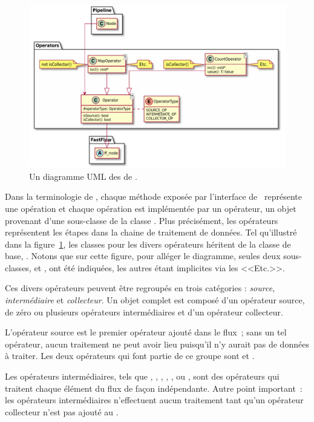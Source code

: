 \begin{figure}
\centering
         \includegraphics[width=1.0\textwidth]{Figures/operators-details.pdf}
      \caption{Un diagramme UML des  de \ppff.}
       \label{operators.fig}
\end{figure}


Dans la terminologie de , chaque m\'ethode expos\'ee par l'interface de \ppff\ repr\'esente une op\'eration et chaque op\'eration est impl\'ement\'ee par un op\'erateur, un objet provenant d'une sous-classe de la classe . Plus pr\'ecisément, les op\'erateurs repr\'esentent les \'etapes dans la chaine de traitement de donn\'ees. Tel qu'illustré dans la figure~\ref{operators.fig}, les classes pour les divers op\'erateurs h\'eritent de la classe de base, . 
%
Notons que sur cette figure, pour alléger le diagramme, seules deux sous-classes,  et , ont été indiqu\'ees, les autres \'etant implicites via les <<Etc.>>.
%

Ces divers opérateurs peuvent \^etre regroupés en trois cat\'egories : \emph{source}, \emph{interm\'ediaire} et \emph{collecteur}.
%
Un objet  complet est compos\'e d'un op\'erateur source, de z\'ero ou plusieurs op\'erateurs interm\'ediaires et d'un op\'erateur collecteur. 

L'op\'erateur source est le premier op\'erateur ajout\'e dans le flux~; sans un tel op\'erateur, aucun traitement ne peut avoir lieu puisqu'il n'y aurait pas de données à traiter. Les deux op\'erateurs qui font partie de ce groupe sont  et .

Les op\'erateurs interm\'ediaires, tels que , , , , ,  ou , sont des op\'erateurs qui traitent chaque \'el\'ement du flux de fa\c{c}on ind\'ependante. Autre point important~: les op\'erateurs interm\'ediaires n'effectuent aucun traitement tant qu'un op\'erateur collecteur n'est pas ajout\'e au . 

